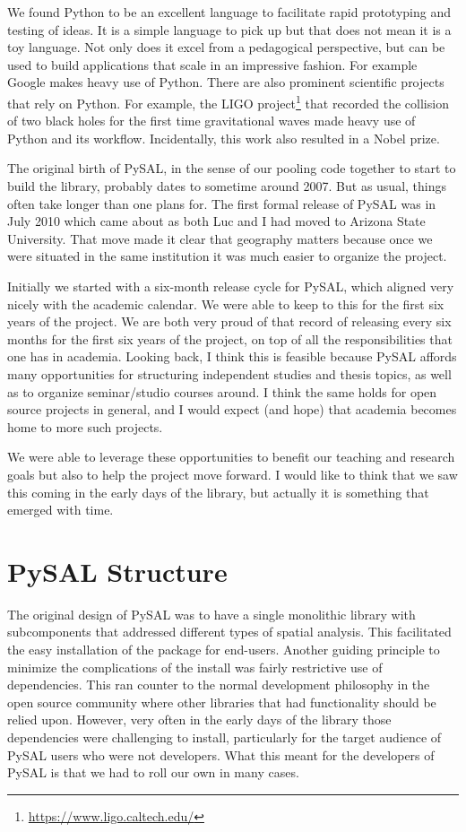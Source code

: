 \documentclass[11pt]{article}
\begin{document}
We found Python to be an excellent language to facilitate rapid prototyping and
testing of ideas. It is a simple language to pick up but that does not mean it
is a toy language. Not only does it excel from a pedagogical perspective, but
can be used to build applications that scale in an impressive fashion. For
example Google makes heavy use of Python. There are also prominent scientific
projects that rely on Python. For example, the LIGO project\footnote{\url{ https://www.ligo.caltech.edu/}} that recorded
the collision of two black holes for the first time gravitational waves made
heavy use of Python and its workflow. Incidentally, this work also resulted in
a Nobel prize.


The original birth of PySAL, in the sense of our pooling code together to start
to build the library, probably dates to sometime around 2007. But as
usual, things often take longer than one plans for. The first formal release of
PySAL was in July 2010 which came about as both Luc and I had moved to Arizona
State University. That move made it clear that geography matters because once
we were situated in the same institution it was much easier to organize the
project.

Initially we started with a six-month release cycle for PySAL, which aligned
very nicely with the academic calendar. We were able to keep to this for the
first six years of the project. We are both very proud of that record of
releasing every six months for the first six years of the project, on top of
all the responsibilities that one has in academia. Looking back, I think this
is feasible because PySAL affords many opportunities for structuring
independent studies and thesis topics, as well as to organize seminar/studio
courses around. I think the same holds for open source projects in general, and
I would expect (and hope) that academia becomes home to more such projects.

We were able to leverage these opportunities to benefit our teaching and
research goals but also to help the project move forward. I would like to think
that we saw this coming in the early days of the library, but actually it is
something that emerged with time.
\section*{PySAL Structure}
\label{sec:orgc8bb64e}
The original design of PySAL was to have a single monolithic library with
subcomponents that addressed different types of spatial analysis. This
facilitated the easy installation of the package for end-users. Another guiding
principle to minimize the complications of the install was fairly restrictive
use of dependencies. This ran counter to the normal development philosophy in
the open source community where other libraries that had functionality should be
relied upon. However, very often in the early days of the library 
those dependencies were challenging to install, particularly for the target
audience of PySAL users who were not developers. What this meant for the
developers of PySAL is that we had to roll our own in many cases.
\end{document}

